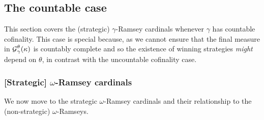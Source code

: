 \documentclass[../../main]{subfiles}
\begin{document}
\subsection{The countable case}

This section covers the (strategic) $\gamma$-Ramsey cardinals whenever $\gamma$ has countable cofinality. This case is special because, as we cannot ensure that the final measure in $\operatorname{\mathcal G}_\gamma^\theta(\kappa)$ is countably complete and so the existence of winning strategies \textit{might} depend on $\theta$, in contrast with the uncountable cofinality case.

\subsubsection{[Strategic] $\omega$-Ramsey cardinals}

We now move to the strategic $\omega$-Ramsey cardinals and their relationship to the (non-strategic) $\omega$-Ramseys. 
\end{document}
